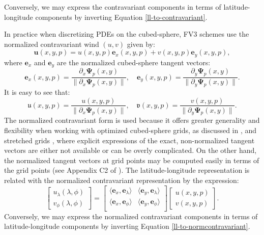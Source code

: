 Conversely, we may express the contravariant components in terms of
latitude-longitude components by inverting Equation \eqref{ll-to-contravariant}.

In practice when discretizing PDEs on the cubed-sphere, FV3 schemes use the normalized contravariant wind
$({u},{v})$ given by:
\begin{equation}
	\label{norm-contravariant-wind}
	\boldsymbol{u}(x, y, p) = 
	{u}(x, y, p) \boldsymbol{e}_x(x, y,p) + 
	{v}(x, y, p) \boldsymbol{e}_y(x, y,p),
\end{equation}
where $\boldsymbol{e}_x$ and $\boldsymbol{e}_y$ are the normalized cubed-sphere tangent vectors:
\begin{equation}
   \boldsymbol{e}_x(x,y,p)  = \frac{\partial_x\boldsymbol{\Psi}_p(x,y)}{\|\partial_x\boldsymbol{\Psi}_p(x,y)\|}, \quad
   \boldsymbol{e}_y(x,y,p)  = \frac{\partial_y\boldsymbol{\Psi}_p(x,y)}{\|\partial_y\boldsymbol{\Psi}_p(x,y)\|}.
\end{equation}
It is easy to see that:
\begin{equation}
	\label{contra-uv}
	\mathfrak{u}(x,y,p)  = \frac{{u}(x,y,p)}{\|\partial_x\boldsymbol{\Psi}_p(x,y)\|}, \quad
	\mathfrak{v}(x,y,p)  = \frac{{v}(x,y,p)}{\|\partial_y\boldsymbol{\Psi}_p(x,y)\|}.
\end{equation}
The normalized contravariant form is used because it offers greater generality and flexibility when working with optimized cubed-sphere grids,
as discussed in \citet{putman:2007}, and stretched grids \citep{harris:2016}, 
where explicit expressions of the exact, non-normalized tangent vectors are either not available or can be overly complicated.
On the other hand, the normalized tangent vectors at grid points may be computed easily in terms of the grid points (see Appendix C2 of \citet{chen:2021}).
The latitude-longitude representation is related with the normalized contravariant representation by the expression:
\begin{equation}
	\label{ll-to-normcontravariant}
	\begin{bmatrix}
		u_\lambda (\lambda, \phi) \\
		v_\phi (\lambda, \phi) 
	\end{bmatrix}
	=
	\begin{bmatrix}
		\langle 	\boldsymbol{e}_x, \boldsymbol{e}_\lambda \rangle 
		& \langle 	\boldsymbol{e}_y, \boldsymbol{e}_\lambda \rangle \\
		\langle 	\boldsymbol{e}_x, \boldsymbol{e}_\phi \rangle 
		& \langle 	\boldsymbol{e}_y, \boldsymbol{e}_\phi \rangle \\
	\end{bmatrix}
	\begin{bmatrix}
		{u}(x,y,p) \\
		{v}(x,y,p)
	\end{bmatrix}.
\end{equation}
Conversely, we may express the normalized contravariant components in terms of
latitude-longitude components by inverting Equation \eqref{ll-to-normcontravariant}.


